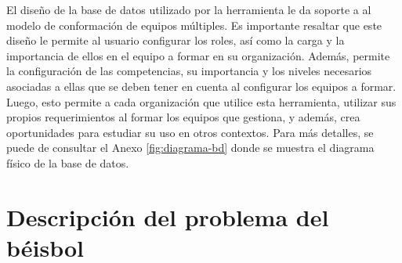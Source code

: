 {\color{red}
	El diseño de la base de datos utilizado por la herramienta le da soporte a al modelo de conformación de equipos múltiples. Es importante resaltar que este diseño le permite al usuario configurar los roles, así como la carga y la importancia de ellos en el equipo a formar en su organización. Además, permite la configuración de las competencias, su importancia y los niveles necesarios asociadas a ellas que se deben tener en cuenta al configurar los equipos a formar. Luego, esto permite a cada organización que utilice esta herramienta, utilizar sus propios requerimientos al formar los equipos que gestiona, y además, crea oportunidades para estudiar su uso en otros contextos. Para más detalles, se puede de consultar el Anexo \ref{fig:diagrama-bd} donde se muestra el diagrama físico de la base de datos.
}
\section{Descripción del problema del béisbol} \label{ej-pel}

